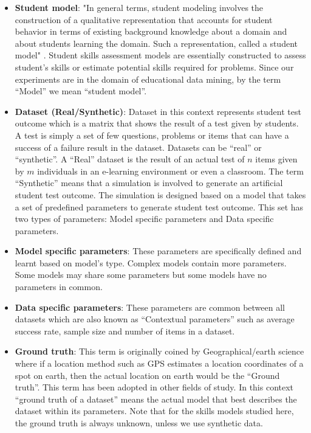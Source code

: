 \begin{itemize}
\item \textbf{Student model}: "In general terms, student modeling involves the construction of a qualitative representation that accounts for student behavior in terms of existing background knowledge about a domain and about students learning the domain. Such a representation, called a student model" \citep{sison1998student}. Student skills assessment models are essentially constructed to assess student's skills or estimate potential skills required for problems. Since our experiments are in the domain of educational data mining, by the term ``Model'' we mean ``student model''. 
\item \textbf{Dataset (Real/Synthetic)}: Dataset in this context represents student test outcome which is a matrix that shows the result of a test given by students. A test is simply a set of few questions, problems or items that can have a success of a failure result in the dataset. Datasets can be ``real'' or ``synthetic''. A ``Real'' dataset is the result of an actual test of $n$ items given by $m$ individuals in an e-learning environment or even a classroom. The term ``Synthetic'' means that a simulation is involved to generate an artificial student test outcome. The simulation is designed based on a model that takes a set of predefined parameters to generate student test outcome. This set has two types of parameters: Model specific parameters and Data specific parameters.
\item \textbf{Model specific parameters}: These parameters are specifically defined and learnt based on model's type. Complex models contain more parameters. Some models may share some parameters but some models have no parameters in common.
\item \textbf{Data specific parameters}: These parameters are common between all datasets which are also known as ``Contextual parameters'' such as average success rate, sample size and number of items in a dataset.
\item \textbf{Ground truth}: This term is originally coined by Geographical/earth science where if a location method such as GPS estimates a location coordinates of a spot on earth, then the actual location on earth would be the ``Ground truth''. This term has been adopted in other fields of study. In this context ``ground truth of a dataset'' means the actual model that best describes the dataset within its parameters. Note that for the skills models studied here, the ground truth is always unknown, unless we use synthetic data.

\end{itemize}
